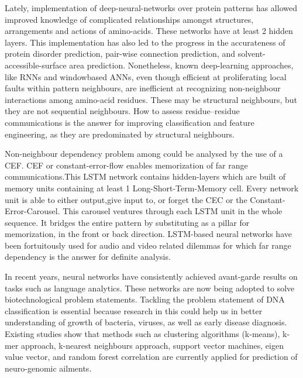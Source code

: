 \documentclass[conference]{IEEEtran}
\begin{document}
Lately, implementation of deep-neural-networks over protein patterns has allowed improved knowledge of complicated relationships amongst structures, arrangements and actions of amino-acids. These networks have at least 2 hidden layers. This implementation has also led to the progress in the accurateness of protein disorder prediction, pair-wise connection prediction, and solvent-accessible-surface area prediction.\cite{danq} Nonetheless, known deep-learning approaches, like RNNs and windowbased ANNs, even though efficient at proliferating local faults within pattern neighbours, are inefficient at recognizing non-neighbour interactions among amino-acid residues. These may be structural neighbours, but they are not sequential neighbours.\cite{shortdna} How to assess residue–residue communications is the answer for improving classification and feature engineering, as they are predominated by structural neighbours.
\newline

Non-neighbour dependency problem among could be analysed by the use of a CEF. CEF or constant-error-flow enables memorization of far range communications.This LSTM network contains hidden-layers which are built of memory units containing at least 1 Long-Short-Term-Memory cell. Every network unit is able to either output,give  input to, or forget the CEC or the Constant-Error-Carousel. This carousel ventures through each LSTM unit in the whole sequence. It bridges the entire pattern by substituting as a pillar for memorization, in the front or back direction. LSTM-based neural networks have been fortuitously used for audio and video related dilemmas for which far range dependency is the answer for definite analysis.
\newline

In recent years, neural networks have consistently achieved avant-garde results on tasks such as language analytics. These networks are now being adopted to solve biotechnological problem statements.\cite{deeprnn} Tackling the problem statement of DNA classification is essential because research in this could help us in better understanding of growth of bacteria, viruses, as well as early disease diagnosis. Existing studies show that methods such as clustering algorithms (k-means), k-mer approach, k-nearest neighbours approach, support vector machines, eigen value vector, and random forest correlation are currently applied for prediction of neuro-genomic ailments.\newline
\end{document}
